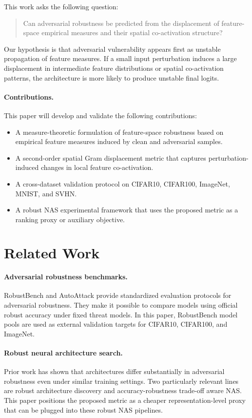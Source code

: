\documentclass[10pt,twocolumn]{article}
\begin{document}
This work asks the following question:
\begin{quote}
Can adversarial robustness be predicted from the displacement of feature-space empirical measures and their spatial co-activation structure?
\end{quote}

Our hypothesis is that adversarial vulnerability appears first as unstable propagation of feature measures.
If a small input perturbation induces a large displacement in intermediate feature distributions or spatial co-activation patterns, the architecture is more likely to produce unstable final logits.

\paragraph{Contributions.}
This paper will develop and validate the following contributions:
\begin{itemize}
  \item A measure-theoretic formulation of feature-space robustness based on empirical feature measures induced by clean and adversarial samples.
  \item A second-order spatial Gram displacement metric that captures perturbation-induced changes in local feature co-activation.
  \item A cross-dataset validation protocol on CIFAR10, CIFAR100, ImageNet, MNIST, and SVHN.
  \item A robust NAS experimental framework that uses the proposed metric as a ranking proxy or auxiliary objective.
\end{itemize}

\section{Related Work}

\paragraph{Adversarial robustness benchmarks.}
RobustBench and AutoAttack provide standardized evaluation protocols for adversarial robustness.
They make it possible to compare models using official robust accuracy under fixed threat models.
In this paper, RobustBench model pools are used as external validation targets for CIFAR10, CIFAR100, and ImageNet.

\paragraph{Robust neural architecture search.}
Prior work has shown that architectures differ substantially in adversarial robustness even under similar training settings.
Two particularly relevant lines are robust architecture discovery and accuracy-robustness trade-off aware NAS.
This paper positions the proposed metric as a cheaper representation-level proxy that can be plugged into these robust NAS pipelines.
\end{document}
